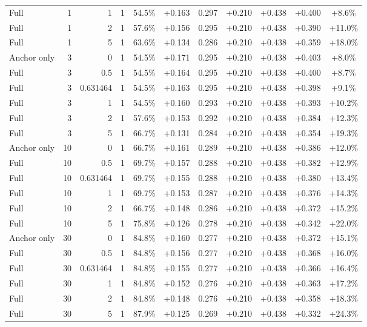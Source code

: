 \begin{table}[htbp]
\begin{tabular}{lrrrccccccc}
Full & 1 & 1 & 1 & 54.5\% & +0.163 & 0.297 & +0.210 & +0.438 & +0.400 & +8.6\% \\
Full & 1 & 2 & 1 & 57.6\% & +0.156 & 0.295 & +0.210 & +0.438 & +0.390 & +11.0\% \\
Full & 1 & 5 & 1 & 63.6\% & +0.134 & 0.286 & +0.210 & +0.438 & +0.359 & +18.0\% \\
Anchor only & 3 & 0 & 1 & 54.5\% & +0.171 & 0.295 & +0.210 & +0.438 & +0.403 & +8.0\% \\
Full & 3 & 0.5 & 1 & 54.5\% & +0.164 & 0.295 & +0.210 & +0.438 & +0.400 & +8.7\% \\
Full & 3 & 0.631464 & 1 & 54.5\% & +0.163 & 0.295 & +0.210 & +0.438 & +0.398 & +9.1\% \\
Full & 3 & 1 & 1 & 54.5\% & +0.160 & 0.293 & +0.210 & +0.438 & +0.393 & +10.2\% \\
Full & 3 & 2 & 1 & 57.6\% & +0.153 & 0.292 & +0.210 & +0.438 & +0.384 & +12.3\% \\
Full & 3 & 5 & 1 & 66.7\% & +0.131 & 0.284 & +0.210 & +0.438 & +0.354 & +19.3\% \\
Anchor only & 10 & 0 & 1 & 66.7\% & +0.161 & 0.289 & +0.210 & +0.438 & +0.386 & +12.0\% \\
Full & 10 & 0.5 & 1 & 69.7\% & +0.157 & 0.288 & +0.210 & +0.438 & +0.382 & +12.9\% \\
Full & 10 & 0.631464 & 1 & 69.7\% & +0.155 & 0.288 & +0.210 & +0.438 & +0.380 & +13.4\% \\
Full & 10 & 1 & 1 & 69.7\% & +0.153 & 0.287 & +0.210 & +0.438 & +0.376 & +14.3\% \\
Full & 10 & 2 & 1 & 66.7\% & +0.148 & 0.286 & +0.210 & +0.438 & +0.372 & +15.2\% \\
Full & 10 & 5 & 1 & 75.8\% & +0.126 & 0.278 & +0.210 & +0.438 & +0.342 & +22.0\% \\
Anchor only & 30 & 0 & 1 & 84.8\% & +0.160 & 0.277 & +0.210 & +0.438 & +0.372 & +15.1\% \\
Full & 30 & 0.5 & 1 & 84.8\% & +0.156 & 0.277 & +0.210 & +0.438 & +0.368 & +16.0\% \\
Full & 30 & 0.631464 & 1 & 84.8\% & +0.155 & 0.277 & +0.210 & +0.438 & +0.366 & +16.4\% \\
Full & 30 & 1 & 1 & 84.8\% & +0.152 & 0.276 & +0.210 & +0.438 & +0.363 & +17.2\% \\
Full & 30 & 2 & 1 & 84.8\% & +0.148 & 0.276 & +0.210 & +0.438 & +0.358 & +18.3\% \\
Full & 30 & 5 & 1 & 87.9\% & +0.125 & 0.269 & +0.210 & +0.438 & +0.332 & +24.3\% \\

\end{tabular}
\end{table}
